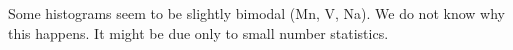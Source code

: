 \documentclass[dvips,12pt,a4paper]{report}
\begin{document}
{{Some histograms seem to be slightly bimodal (Mn, V, Na). We do not know why this happens. It might be due only to small number statistics. 









}}
\end{document}
